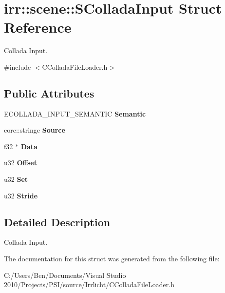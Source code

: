 \hypertarget{structirr_1_1scene_1_1_s_collada_input}{\section{irr\-:\-:scene\-:\-:S\-Collada\-Input Struct Reference}
\label{structirr_1_1scene_1_1_s_collada_input}
}


Collada Input.  




{\ttfamily \#include $<$C\-Collada\-File\-Loader.\-h$>$}

\subsection*{Public Attributes}
\begin{DoxyCompactItemize}
\item 
\hypertarget{structirr_1_1scene_1_1_s_collada_input_af046531a1ad3e1d52d46fb9a0882def6}{E\-C\-O\-L\-L\-A\-D\-A\-\_\-\-I\-N\-P\-U\-T\-\_\-\-S\-E\-M\-A\-N\-T\-I\-C {\bfseries Semantic}}\label{structirr_1_1scene_1_1_s_collada_input_af046531a1ad3e1d52d46fb9a0882def6}

\item 
\hypertarget{structirr_1_1scene_1_1_s_collada_input_ab3e4995a14019f8f7033825e2dd402d6}{core\-::stringc {\bfseries Source}}\label{structirr_1_1scene_1_1_s_collada_input_ab3e4995a14019f8f7033825e2dd402d6}

\item 
\hypertarget{structirr_1_1scene_1_1_s_collada_input_a2a75ec60498175555aef79f029ea6af7}{f32 $\ast$ {\bfseries Data}}\label{structirr_1_1scene_1_1_s_collada_input_a2a75ec60498175555aef79f029ea6af7}

\item 
\hypertarget{structirr_1_1scene_1_1_s_collada_input_ae79a468173fe37cb1b7259d75334ab6c}{u32 {\bfseries Offset}}\label{structirr_1_1scene_1_1_s_collada_input_ae79a468173fe37cb1b7259d75334ab6c}

\item 
\hypertarget{structirr_1_1scene_1_1_s_collada_input_a1403c93c96a2d15081d50371eb432483}{u32 {\bfseries Set}}\label{structirr_1_1scene_1_1_s_collada_input_a1403c93c96a2d15081d50371eb432483}

\item 
\hypertarget{structirr_1_1scene_1_1_s_collada_input_a46b16b3e600d0a886a2299264fada790}{u32 {\bfseries Stride}}\label{structirr_1_1scene_1_1_s_collada_input_a46b16b3e600d0a886a2299264fada790}

\end{DoxyCompactItemize}


\subsection{Detailed Description}
Collada Input. 

The documentation for this struct was generated from the following file\-:\begin{DoxyCompactItemize}
\item 
C\-:/\-Users/\-Ben/\-Documents/\-Visual Studio 2010/\-Projects/\-P\-S\-I/source/\-Irrlicht/C\-Collada\-File\-Loader.\-h\end{DoxyCompactItemize}
